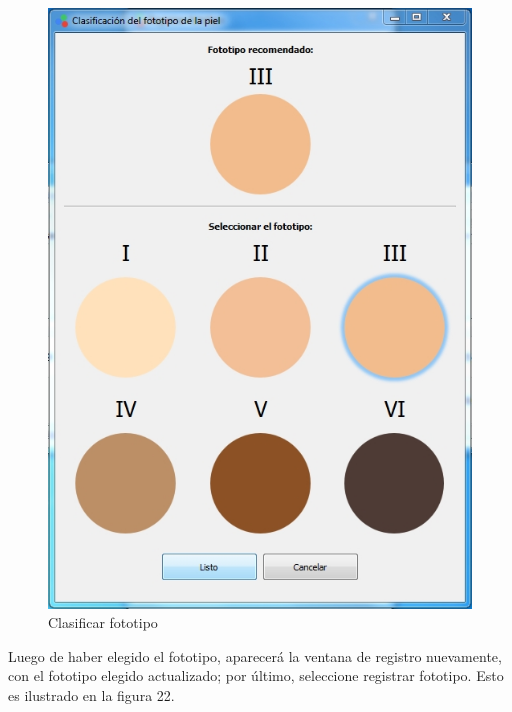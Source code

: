 		
\begin{figure}[H]
  \centering
  \includegraphics[width=.8\linewidth]{./img/fototipo.jpg}
\caption{Clasificar fototipo}
\end{figure}
\newpage
	Luego de haber elegido el fototipo, aparecer\'{a} la ventana de registro nuevamente, con el fototipo elegido actualizado; por \'{u}ltimo, seleccione registrar fototipo. Esto es ilustrado en la figura 22.

